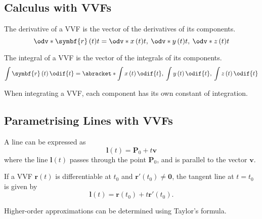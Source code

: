 \documentclass{article}
\begin{document}
\subsection{Calculus with VVFs}
\begin{theorem}
    The derivative of a VVF is the vector of the derivatives of its
    components.
    \begin{equation*}
        \odv*{\symbf{r}\left( t \right)}{t} = \*{\odv*{x\left( t \right)}{t},\: \odv*{y\left( t \right)}{t},\: \odv*{z\left( t \right)}{t}}
    \end{equation*}
\end{theorem}
\begin{theorem}
    The integral of a VVF is the vector of the integrals of its
    components.
    \begin{equation*}
        \int \symbf{r}\left( t \right) \odif{t}
        = \abracket*{\int x\left( t \right) \odif{t},\: \int y\left( t \right) \odif{t},\: \int z\left( t \right) \odif{t}}
    \end{equation*}
\end{theorem}
\begin{remark}
    When integrating a VVF, each component has its own constant of
    integration.
\end{remark}
\subsection{Parametrising Lines with VVFs}
\begin{definition}
    A line can be expressed as
    \begin{equation*}
        \symbf{l}\left( t \right) = \symbf{P}_0 + t\symbf{v}
    \end{equation*}
    where the line \(\symbf{l}\left( t \right)\) passes through the point
    \(\symbf{P}_0\), and is parallel to the vector \(\symbf{v}\).
\end{definition}
\begin{definition}
    If a VVF \(\symbf{r}\left( t \right)\) is differentiable at \(t_0\) and
    \(\symbf{r'}\left( t_0 \right)\ne\symbf{0}\), the tangent line at \(t=t_0\) is
    given by
    \begin{equation*}
        \symbf{l}\left( t \right) = \symbf{r}\left( t_0 \right)+t\symbf{r'}\left( t_0 \right).
    \end{equation*}
\end{definition}
\begin{remark}
    Higher-order approximations can be determined using Taylor's formula.
\end{remark}
\end{document}
